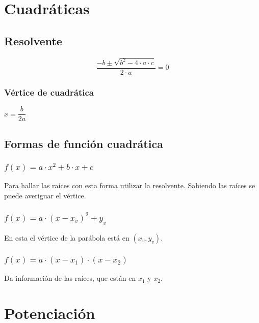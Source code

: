 \section{Cuadráticas}


\begin{multicols}{2}
\subsection*{Resolvente}

$$\dfrac{-b \pm \sqrt{b^2 - 4\cdot a \cdot c}}{2\cdot a} = 0$$

\subsubsection*{Vértice de cuadrática}

\hfil$x= \dfrac{b}{2a}$\hfil
    
\end{multicols}


\subsection*{Formas de función cuadrática}

\subsubsection*{
$f(x)=a\cdot x^2 + b \cdot x + c$}

Para hallar las raíces con esta forma utilizar la resolvente. Sabiendo las raíces se puede averiguar el vértice. 

\subsubsection*{
$f(x)= a\cdot(x-x_v)^2 + y_v$}

En esta el vértice de la parábola está en $(x_v, y_v)$.

\subsubsection*{
$f(x)=a\cdot (x-x_1) \cdot (x-x_2)$}

Da información de las raíces, que están en $x_1$ y $x_2$.


\section{Potenciación}

